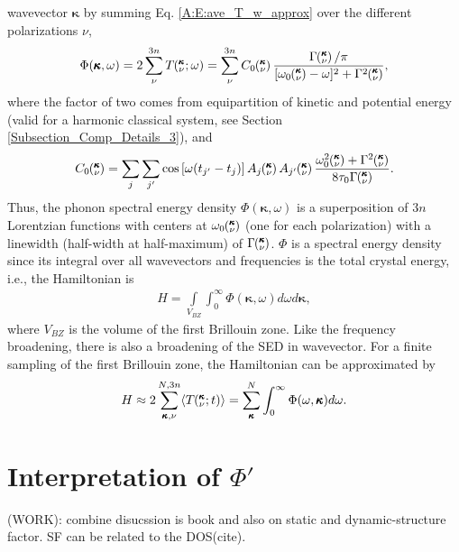 wavevector $\pmb{\kappa}$ by summing Eq$.$ \eqref{A:E:ave_T_w_approx} 
over the different polarizations $\nu$,
\begin{equation}\label{A:E:Lorentzian_NMD}
\begin{split}
\Phi(\pmb{\kappa},\omega) = 2\sum_{\nu}^{3n} T\kvw=\sum_{\nu}^{3n}C_0\kv
\frac{\Gamma\kv/\pi}{[\omega_0\kv-\omega]^2+\Gamma^2\kv},
\end{split}
\end{equation}
where the factor of two comes from equipartition of kinetic and potential 
energy (valid for a harmonic classical system, see Section 
\ref{Subsection_Comp_Details_3}), and
\begin{equation}\label{A:E:C_0}
\begin{split}
C_0\kv = \sum_j\sum_{j'}\cos\left[\omega (t_{j'}-t_j)\right]A_j\kv A_{j'}
\kv\frac{\omega_0^2\kv+\Gamma^2\kv}{8\tau_0\Gamma\kv}.
\end{split}
\end{equation}
Thus, the phonon spectral energy density $\Phi(\pmb{\kappa},\omega)$ is 
a superposition of $3n$ Lorentzian
functions with centers at $\omega_0\mspace{-4.0mu}\left(\mspace{-8.0mu} \begin{smallmatrix}&\pmb{\kappa} \\&\nu \end{smallmatrix}\mspace{-3.0mu}\right)$ (one for each polarization) with 
a linewidth (half-width at half-maximum) of
$\Gamma\mspace{-4.0mu}\left(\mspace{-8.0mu} \begin{smallmatrix}&\pmb{\kappa} \\&\nu \end{smallmatrix}\mspace{-3.0mu}\right)$. $\Phi$ is a spectral energy density since its integral over 
all wavevectors and frequencies is the total crystal energy, i.e., the Hamiltonian is
\begin{equation}\label{A:E:equipartition}
\begin{split}
H=\int\limits_{V_{BZ}} \int_{0}^{\infty}\Phi(\pmb{\kappa},\omega)d\omega 
d\pmb{\kappa},
\end{split}
\end{equation}
where $V_{BZ}$ is the volume of the first Brillouin zone.  Like the 
frequency broadening, there is also a broadening of the SED in wavevector.
\cite{turneythesis} For a finite sampling of the first Brillouin zone, 
the Hamiltonian can be approximated by
\begin{equation}\label{A:E:equipartition}
\begin{split}
H \approx 2\sum_{\pmb{\kappa},\nu}^{N,3n}\langle T\mspace{-4.0mu}\left(\mspace{-8.0mu} \begin{smallmatrix}&\pmb{\kappa} \\&\nu \end{smallmatrix}\mspace{-2.0mu};t\right)\rangle = 
\sum_{\pmb{\kappa}}^N \int_{0}^{\infty}\Phi(\omega,\pmb{\kappa})d\omega.
\end{split}
\end{equation}
\section{\label{Appendix_B}Interpretation of $\Phi'$}
(WORK): combine disucssion is book and also on static and 
dynamic-structure factor.  
SF can be related to the DOS(cite).  

